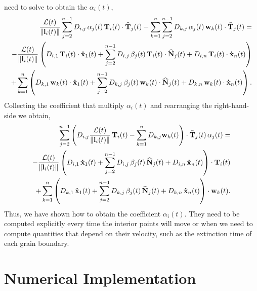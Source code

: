 need to solve to obtain the $\alpha_i(t)$,
%
\begin{align*}
    \dfrac{\AL(t)}{\norm{\mylvec_i(t)}}
    \sum_{j=2}^{n-1}D_{i,j}\,\alpha_j(t)\,\T_i(t)\cdot\hatT_j(t)-\sum_{k=1}^n \sum_{j=2}^{n-1}D_{k,j}\,\alpha_j(t)\,\mathbf{w}_k(t)\cdot\hatT_j(t)=&\\
    -\dfrac{\AL(t)}{\norm{\mylvec_i(t)}}\left(D_{i,1}\,\T_i(t)\cdot\dotx_{1}(t)+\sum_{j=2}^{n-1}D_{i,j}\,\beta_j(t)\,\T_i(t)\cdot\hatN_j(t)+D_{i,n}\,\T_i(t)\cdot\dotx_{n}(t)\right)\\
    +
    \sum_{k=1}^n
    \left(D_{k,1}\,\mathbf{w}_k(t)\cdot\dotx_{1}(t)+\sum_{j=2}^{n-1}D_{k,j}\,\beta_j(t)\,\mathbf{w}_k(t)\cdot\hatN_j(t)+D_{k,n}\,\mathbf{w}_k(t)\cdot\dotx_{n}(t)\right).
\end{align*}
%
Collecting the coefficient that multiply $\alpha_i(t)$ and rearranging the right-hand-side we obtain,
\begin{align*}
    \sum_{j=2}^{n-1}\left(D_{i,j}\dfrac{\AL(t)}{\norm{\mylvec_i(t)}}\,\T_i(t)-\sum_{k=1}^n D_{k,j}\mathbf{w}_k(t)\right)\cdot\hatT_j(t)\,\alpha_j(t)=&\\
    -\dfrac{\mathcal{L}(t)}{\norm{\mylvec_i(t)}}\left(D_{i,1}\,\dotx_{1}(t)+\sum_{j=2}^{n-1}D_{i,j}\,\beta_j(t)\,\hatN_j(t)+D_{i,n}\,\dotx_{n}(t)\right)\cdot\T_i(t)\\
    +
    \sum_{k=1}^n
    \left(D_{k,1}\,\dotx_{1}(t)+\sum_{j=2}^{n-1}D_{k,j}\,\beta_j(t)\,\hatN_j(t)+D_{k,n}\,\dotx_{n}(t)\right)\cdot\mathbf{w}_k(t).
\end{align*}
%
Thus, we have shown how to obtain the coefficient $\alpha_i(t)$. 
They need to be computed explicitly
every time the interior points will move
or when we need to compute quantities
that depend on their velocity, such as
the extinction time of each grain boundary.


\section{Numerical Implementation}

